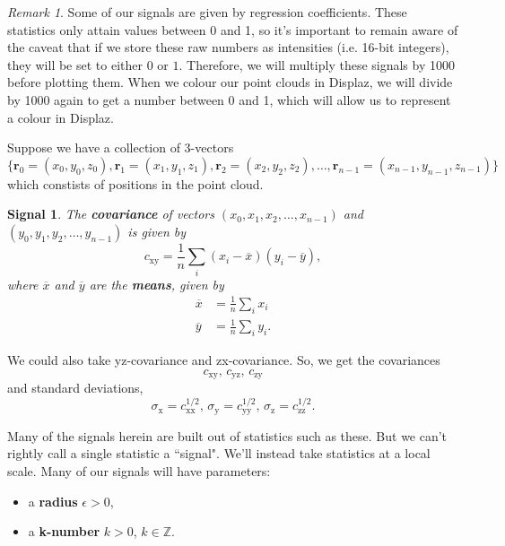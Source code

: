 \documentclass[a4paper,11pt,twoside]{article}
\newtheorem*{signals}{Signal}
\theoremstyle{definition}
\theoremstyle{remark}
\newtheorem{rmk}[thm]{Remark}
\newenvironment{sigs}
   {\colorlet{shadecolor}{green!50}\begin{shaded}\begin{signals}}
   {\end{signals}\end{shaded}}
\begin{document}
\begin{rmk}Some of our signals are given by regression coefficients. These statistics only attain values between 0 and 1, so it's important to remain aware of the caveat that if we store these raw numbers as intensities (i.e. 16-bit integers), they will be set to either $0$ or $1$. Therefore, we will multiply these signals by 1000 before plotting them. When we colour our point clouds in Displaz, we will divide by 1000 again to get a number between 0 and 1, which will allow us to represent a colour in Displaz.
\end{rmk}
Suppose we have a collection of 3-vectors
\begin{displaymath}
\{\textbf{r}_0=(x_0,y_0,z_0),\textbf{r}_1=(x_1,y_1,z_1),\textbf{r}_2=(x_2,y_2,z_2),\dots,\textbf{r}_{n-1}=(x_{n-1},y_{n-1},z_{n-1})\}
\end{displaymath}
which constists of positions in the point cloud. 
\begin{sigs}
The \textbf{covariance} of vectors $(x_0,x_1,x_2,\dots,x_{n-1})$ and $(y_0,y_1,y_2,\dots,y_{n-1})$ is given by
\begin{displaymath}
c_\mathrm{xy}=\frac{1}{n}\sum_i(x_i-\overline x)(y_i-\overline y),
\end{displaymath}
where $\overline x$ and $\overline y$ are the \textbf{means}, given by
\begin{align*}
\overline x&=\frac{1}{n}\sum_i x_i
\\
\overline y&=\frac{1}{n}\sum_i y_i.
\end{align*}
\end{sigs}
We could also take yz-covariance and zx-covariance. So, we get the covariances
\begin{displaymath}
c_\mathrm{xy}\text{, }c_\mathrm{yz}\text{, }c_\mathrm{zy}
\end{displaymath}
and standard deviations, 
\begin{displaymath}
\sigma_\mathrm{x}=c_\mathrm{xx}^{1/2}\text{, }\sigma_\mathrm{y}=c_\mathrm{yy}^{1/2}\text{, }\sigma_\mathrm{z}=c_\mathrm{zz}^{1/2}.
\end{displaymath}

Many of the signals herein are built out of statistics such as these. But we can't rightly call a single statistic a ``signal". We'll instead take statistics at a local scale. Many of our signals will have parameters:
\begin{itemize}
\item a \textbf{radius} $\epsilon>0$,
\item a \textbf{k-number} $k>0$, $k\in\mathbb{Z}$.
\end{itemize}
\end{document}
